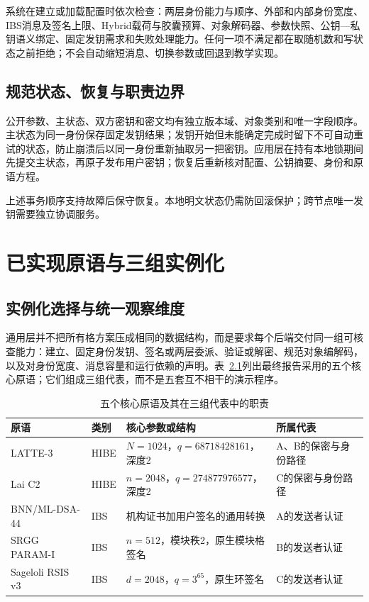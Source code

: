 \documentclass[UTF8,a4paper,12pt,oneside,openany,fontset=fandol]{ctexrep}
\begin{document}
系统在建立或加载配置时依次检查：两层身份能力与顺序、外部和内部身份宽度、IBS消息及签名上限、Hybrid载荷与胶囊预算、对象解码器、参数快照、公钥—私钥语义绑定、固定发钥需求和失败处理能力。任何一项不满足都在取随机数和写状态之前拒绝；不会自动缩短消息、切换参数或回退到教学实现。

\section{规范状态、恢复与职责边界}
公开参数、主状态、双方密钥和密文均有独立版本域、对象类别和唯一字段顺序。主状态为同一身份保存固定发钥结果；发钥开始但未能确定完成时留下不可自动重试的状态，防止崩溃后以同一身份重新抽取另一把密钥。应用层在持有本地锁期间先提交主状态，再原子发布用户密钥；恢复后重新核对配置、公钥摘要、身份和原语方程。

上述事务顺序支持故障后保守恢复。本地明文状态仍需防回滚保护；跨节点唯一发钥需要独立协调服务。

\chapter{已实现原语与三组实例化}

\section{实例化选择与统一观察维度}
通用层并不把所有格方案压成相同的数据结构，而是要求每个后端交付同一组可核查能力：建立、固定身份发钥、签名或两层委派、验证或解密、规范对象编解码，以及对身份宽度、消息容量和运行依赖的声明。表~\ref{tab:five-primitives}列出最终报告采用的五个核心原语；它们组成三组代表，而不是五套互不相干的演示程序。

\begin{table}[htbp]
\centering
\small
\caption{五个核心原语及其在三组代表中的职责}
\label{tab:five-primitives}
\begin{tabularx}{\textwidth}{@{}>{\raggedright\arraybackslash}p{}>{\raggedright\arraybackslash}p{}>{\raggedright\arraybackslash}X>{\raggedright\arraybackslash}p{}@{}}
\toprule
\rowcolor{black!8} 原语 & 类别 & 核心参数或结构 & 所属代表 \\
\midrule
LATTE-3 & HIBE & $N=1024$，$q=68718428161$，深度2 & A、B的保密与身份路径 \\
Lai C2 & HIBE & $n=2048$，$q=274877976577$，深度2 & C的保密与身份路径 \\
BNN/ML-DSA-44 & IBS & 机构证书加用户签名的通用转换 & A的发送者认证 \\
SRGG PARAM-I & IBS & $n=512$，模块秩2，原生模块格签名 & B的发送者认证 \\
Sageloli RSIS v3 & IBS & $d=2048$，$q=3^{65}$，原生环签名 & C的发送者认证 \\
\bottomrule
\end{tabularx}
\end{table}
\end{document}

